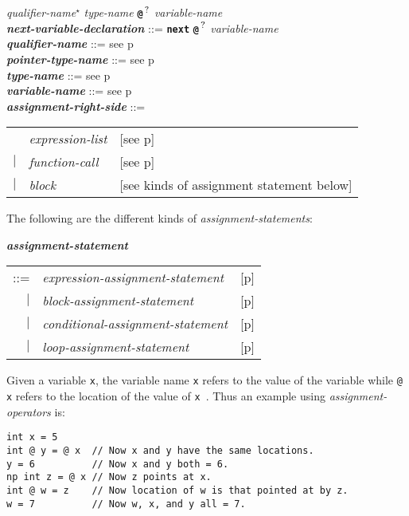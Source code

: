 \documentclass[12pt]{article}
\newcommand{\TT}[1]{{\tt \bfseries #1}}
\newcommand{\STAR}{{\Large $^\star$}}
\newcommand{\QMARK}{{$^{\,\mbox{\footnotesize ?}}$}}
\newcommand{\ttkey}[1]{{\tt \bfseries #1}}
\newcommand{\emkey}[1]{{\em \bfseries #1}}
\newcommand{\pagref}[1]{p\pageref{#1}}
\newenvironment{indpar}[1][0.3in]%
	{\begin{list}{}%
		     {\setlength{\itemsep}{0in}%
		      \setlength{\topsep}{0in}%
		      \setlength{\parsep}{1ex}%
		      \setlength{\labelwidth}{#1}%
		      \setlength{\leftmargin}{#1}%
		      \addtolength{\leftmargin}{\labelsep}}%
	 \item}%
	{\end{list}}
\begin{document}
\begin{indpar}
        {\em qualifier-name}\STAR{} {\em type-name}
        \TT{@}\QMARK{} {\em variable-name}
\\[0.5ex]
\emkey{next-variable-declaration}\label{NEXT-VARIABLE-DECLARATION}
    ::= \ttkey{next} \TT{@}\QMARK{} {\em variable-name}
\\[0.5ex]
\emkey{qualifier-name} ::= see \pagref{QUALIFIER-NAME}
\\[0.5ex]
\emkey{pointer-type-name} ::= see \pagref{POINTER-TYPE-NAME}
\\[0.5ex]
\emkey{type-name} ::= see \pagref{TYPE-NAME}
\\[0.5ex]
\emkey{variable-name} ::= see \pagref{VARIABLE-NAME}
\\[0.5ex]
\emkey{assignment-right-side}\label{ASSIGNMENT-RIGHT-SIDE} ::= \\
\hspace*{1in}
    \begin{tabular}[t]{@{}rll}
        & {\em expression-list}
    		& [see \pagref{EXPRESSION-LIST}] \\
    $|$ & {\em function-call}
    		& [see \pagref{FUNCTION-CALLS}] \\
    $|$ & {\em block}
	        & [see kinds of assignment statement below] \\
    \end{tabular}
\end{indpar}

The following are the different kinds of {\em assignment-statements}:
\begin{indpar}
\emkey{assignment-statement}
    \begin{tabular}[t]{@{}rll}
    ::= & {\em expression-assignment-statement}
    	& [\pagref{EXPRESSION-ASSIGNMENT-STATEMENTS}] \\
    $|$ & {\em block-assignment-statement}
        & [\pagref{BLOCK-ASSIGNMENT-STATEMENTS}] \\
    $|$ & {\em conditional-assignment-statement}
        & [\pagref{CONDITIONAL-ASSIGNMENT-STATEMENTS}] \\
    $|$ & {\em loop-assignment-statement}
        & [\pagref{LOOP-ASSIGNMENT-STATEMENTS}] \\
    \end{tabular}
\end{indpar}


Given a variable {\tt x}, the variable name {\tt x} refers to the
value of the variable while {\tt @ x} refers to the location of
the value of {\tt x }.
Thus an example using {\em assignment-operators} is:
\begin{indpar}\begin{verbatim}
int x = 5
int @ y = @ x  // Now x and y have the same locations.
y = 6          // Now x and y both = 6.
np int z = @ x // Now z points at x.
int @ w = z    // Now location of w is that pointed at by z.
w = 7          // Now w, x, and y all = 7.
\end{verbatim}\end{indpar}
\end{document}
